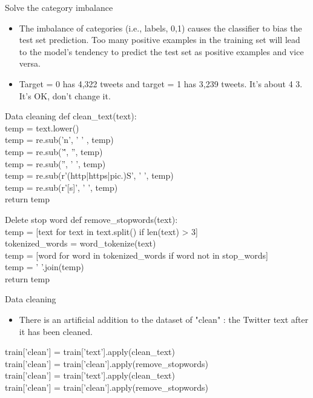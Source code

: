 \documentclass[
 size=14pt,
 paper=smartboard,  %
 mode=present, 		%
 display=slides, 	%
 style=tuliplab,  	%
 pauseslide,
 fleqn,leqno]{powerdot}
\begin{document}
\begin{slide}{Solve the category imbalance}
\begin{itemize}
	\item  The imbalance of categories (i.e., labels, 0,1) causes the classifier to bias the test set prediction. Too many positive examples in the training set will lead to the model's tendency to predict the test set as positive examples and vice versa. \\
\item Target = 0 has 4,322 tweets and target = 1 has 3,239 tweets. It's about 4 3. It's OK, don't change it.\\
\end{itemize}
\end{slide}

\begin{slide}{Data cleaning}
	def clean\_text(text):\\
	temp = text.lower()          \\                       
	temp = re.sub('n', ' ' , temp)   \\                  
	temp = re.sub('\'', '', temp)     \\                  
	temp = re.sub('', ' ', temp)    \\                   
	temp = re.sub(r'(http|https|pic.)S', ' ', temp)    \\
	temp = re.sub(r'[s]', ' ', temp)       \\         
	return temp
\end{slide}
\begin{slide}{Delete stop word}
def remove\_stopwords(text):\\
	temp = [text for text in text.split() if len(text) > 3]\\
	tokenized\_words = word\_tokenize(text)\\
	temp = [word for word in tokenized\_words if word not in stop\_words]\\
	temp = ' '.join(temp)\\
	return temp\\
\end{slide}
\begin{slide}{Data cleaning}
\begin{itemize}
	\item There is an artificial addition to the dataset of "clean" : the Twitter text after it has been cleaned.\\
\end{itemize}
train['clean'] = train['text'].apply(clean\_text)\\
train['clean'] = train['clean'].apply(remove\_stopwords)\\
train['clean'] = train['text'].apply(clean\_text)\\
train['clean'] = train['clean'].apply(remove\_stopwords)\\
\end{slide}
\end{document}
